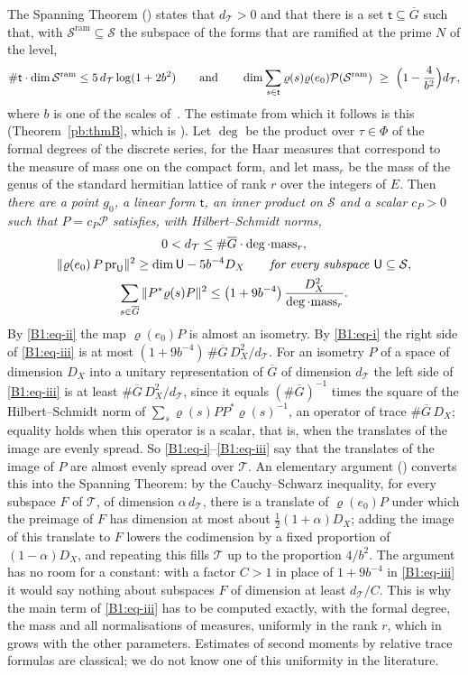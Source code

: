 \documentclass[10pt]{amsart}
\theoremstyle{definition}
\theoremstyle{remark}
\providecommand{\auDX}{D_X}
\providecommand{\auG}{\overline G}
\providecommand{\auP}{\mathcal P}
\providecommand{\auPl}{\Phi}
\providecommand{\auS}{\mathcal S}
\providecommand{\auSram}{\mathcal S^{\mathrm{ram}}}
\providecommand{\auT}{\mathcal T}
\providecommand{\audT}{d_{\auT}}
\begin{document}
The Spanning Theorem ({\cite[Theorem~14.14]{P46}}) states that $\audT>0$ and that there is a set
$\mathsf t\subseteq\auG$ such that, with $\auSram\subseteq\auS$ the subspace of the forms that
are ramified at the prime $N$ of the level,
\[
\#\mathsf t\cdot\dim\auSram\le5\,\audT\log(1+2b^2)\qquad\text{and}\qquad
\dim\sum_{s\in\mathsf t}\varrho(s)\varrho(e_0)\auP(\auSram)\ \ge\ \Bigl(1-\frac4{b^2}\Bigr)\audT ,
\]
where $b$ is one of the scales of~\cite{P46}. The estimate from which it follows is this
(Theorem~\ref{pb:thmB}, which is {\cite[Proposition~14.32]{P46}}). Let $\deg$ be the product over
$\tau\in\auPl$ of the formal degrees of the discrete series, for the Haar measures that
correspond to the measure of mass one on the compact form, and let $\mathrm{mass}_r$ be the mass
of the genus of the standard hermitian lattice of rank $r$ over the integers of $E$. Then
\emph{there are a point $g_0$, a linear form $\mathsf t$, an inner product on $\auS$ and a scalar
$c_P>0$ such that $P=c_P\auP$ satisfies, with Hilbert--Schmidt norms,}
\begin{gather}
0<\audT\le\#\auG\cdot\deg\cdot\mathrm{mass}_r,\label{B1:eq-i}\\
\|\varrho(e_0)\,P\,\mathrm{pr}_{\mathsf U}\|^2\ge\dim\mathsf U-5b^{-4}\auDX\qquad\text{\emph{for
every subspace} }\mathsf U\subseteq\auS,\label{B1:eq-ii}\\
\sum_{s\in\auG}\|P^*\varrho(s)P\|^2\le\bigl(1+9b^{-4}\bigr)\,\frac{\auDX^2}{\deg\cdot\mathrm{mass}_r}.
\label{B1:eq-iii}
\end{gather}
By \eqref{B1:eq-ii} the map $\varrho(e_0)P$ is almost an isometry. By \eqref{B1:eq-i} the right
side of \eqref{B1:eq-iii} is at most $(1+9b^{-4})\,\#\auG\,\auDX^2/\audT$. For an isometry $P$
of a space of dimension $\auDX$ into a unitary representation of $\auG$ of dimension $\audT$ the
left side of \eqref{B1:eq-iii} is at least $\#\auG\,\auDX^2/\audT$, since it equals $(\#\auG)^{-1}$
times the square of the Hilbert--Schmidt norm of $\sum_s\varrho(s)PP^*\varrho(s)^{-1}$, an operator
of trace $\#\auG\,\auDX$; equality holds when this operator is a scalar, that is, when the
translates of the image are evenly spread. So \eqref{B1:eq-i}--\eqref{B1:eq-iii} say that the
translates of the image of $P$ are almost evenly spread over $\auT$. An elementary argument
({\cite[Lemmas~14.30 and~14.31]{P46}}) converts this into the Spanning Theorem: by the
Cauchy--Schwarz inequality, for every subspace $F$ of $\auT$, of dimension $\alpha\,\audT$, there
is a translate of $\varrho(e_0)P$ under which the preimage of $F$ has dimension at most about
$\tfrac12(1+\alpha)\auDX$; adding the image of this translate to $F$ lowers the codimension by a
fixed proportion of $(1-\alpha)\auDX$, and repeating this fills $\auT$ up to the proportion
$4/b^2$. The argument has no room for a constant: with a factor $C>1$ in place of $1+9b^{-4}$ in
\eqref{B1:eq-iii} it would say nothing about subspaces $F$ of dimension at least $\audT/C$. This is why the main term of
\eqref{B1:eq-iii} has to be computed exactly, with the formal degree, the mass and all
normalisations of measures, uniformly in the rank $r$, which in~\cite{P46} grows with the other
parameters. Estimates of second moments by relative trace formulas are classical; we do not know
one of this uniformity in the literature.
\end{document}

